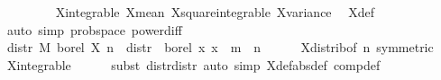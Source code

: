 {\ \ \ \ \isamarkupfalse%
\ {\isacartoucheopen}{}\ {\isacharless}\ {\isasymsigma}{\isacartoucheclose}\ X{\isacharunderscore}integrable\ X{\isacharunderscore}mean\ X{\isacharunderscore}square{\isacharunderscore}integrable\ X{\isacharunderscore}variance\ \isamarkupfalse%
\ X{\isacharprime}{\isacharunderscore}def\isanewline
\ \ \ \ \isamarkupfalse%
\ {\isacharparenleft}auto\ simp{\isacharcolon}\ prob{\isacharunderscore}space\ power{}{\isacharunderscore}diff{\isacharparenright}\isanewline
\ \ \isamarkupfalse%
\ {\isachardoublequoteopen}distr\ M\ borel\ {\isacharparenleft}X{\isacharprime}\ n{\isacharparenright}\ {\isacharequal}\ distr\ {\isasymmu}\ borel\ {\isacharparenleft}{\isasymlambda}x{\isachardot}\ x\ {\isacharminus}\ m{\isacharparenright}{\isachardoublequoteclose}\ \ n\isanewline
\ \ \ \ \isamarkupfalse%
\ X{\isacharunderscore}distrib{\isacharbrackleft}of\ n{\isacharcomma}\ symmetric{\isacharbrackright}\ \isamarkupfalse%
\ X{\isacharunderscore}integrable\isanewline
\ \ \ \ \isamarkupfalse%
\ {\isacharparenleft}subst\ distr{\isacharunderscore}distr{\isacharparenright}\ {\isacharparenleft}auto\ simp{\isacharcolon}\ X{\isacharprime}{\isacharunderscore}def{\isacharbrackleft}abs{\isacharunderscore}def{\isacharbrackright}\ comp{\isacharunderscore}def{\isacharparenright}\isanewline
{}\isamarkupfalse%
%
\endisatagproof
{\isafoldproof}%
%
\isadelimproof
%
\endisadelimproof
%
}%
